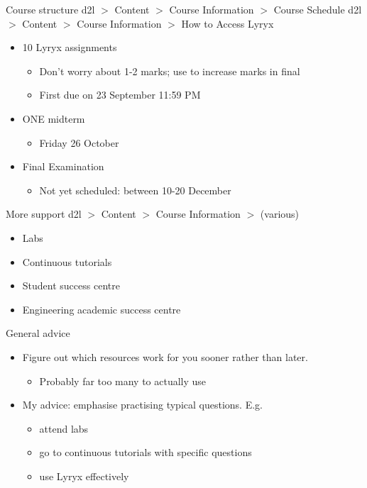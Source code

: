 \documentclass{beamer}
\begin{document}
\begin{frame}{Course structure}
  d2l $>$ Content $>$ Course Information $>$ Course Schedule\vfill
  d2l $>$ Content $>$ Course Information $>$ How to Access Lyryx\vfill
  \begin{itemize}
  \item 10 Lyryx assignments
    \begin{itemize}
    \item Don't worry about 1-2 marks; use to increase marks in final
    \item First due on 23 September 11:59 PM
    \end{itemize}\vfill
  \item ONE midterm
    \begin{itemize}
    \item Friday 26 October
    \end{itemize}\vfill
  \item Final Examination
    \begin{itemize}
    \item Not yet scheduled: between 10-20 December
    \end{itemize}\vfill
  \end{itemize}
\end{frame}

\begin{frame}{More support}
  d2l $>$ Content $>$ Course Information $>$ (various)\vfill
  \begin{itemize}
  \item Labs\vfill
  \item Continuous tutorials\vfill
  \item Student success centre\vfill
  \item Engineering academic success centre
  \end{itemize}
\end{frame}

\begin{frame}{General advice}
  \begin{itemize}
  \item Figure out which resources work for you sooner rather than later.
    \begin{itemize}
    \item Probably far too many to actually use
    \end{itemize}
    \vfill
  \item My advice: emphasise practising typical questions. E.g.
    \begin{itemize}
    \item attend labs
    \item go to continuous tutorials with specific questions
    \item use Lyryx effectively
    \end{itemize}\vfill
  \end{itemize}
\end{frame}
\end{document}
